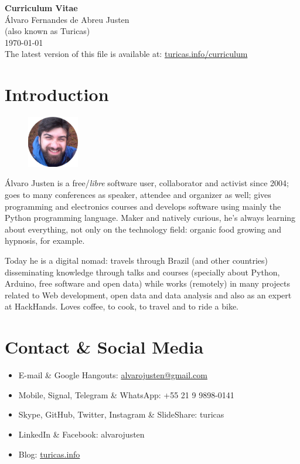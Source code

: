 \documentclass[a4paper,11pt]{article}
\begin{document}
\pagestyle{empty}

\begin{center}
 \huge{\textbf{Curriculum Vitae}}
 \\
 \huge{Álvaro Fernandes de Abreu Justen}
 \\
 \small{(also known as Turicas)}
 \large{\\}
 \large{\today}
 \\
 \small{The latest version of this file is available at:
        \href{http://turicas.info/curriculum}{turicas.info/curriculum}}
\end{center}

\newcommand{\titulo}[1]{\section*{#1}}
\renewcommand{\labelitemi}{$\diamond$}
\renewcommand{\labelitemii}{$\rightarrow$}

\titulo{Introduction}
\begin{figure}
	\begin{center}
		\includegraphics[width=0.2\textwidth]{turicas}
	\end{center}
\end{figure}

Álvaro Justen is a free/\textit{libre} software user, collaborator and activist
since 2004; goes to many conferences as speaker, attendee and organizer as
well; gives programming and electronics courses and develops software using
mainly the Python programming language. Maker and natively curious, he's always
learning about everything, not only on the technology field: organic food
growing and hypnosis, for example.

Today he is a digital nomad: travels through Brazil (and other countries)
disseminating knowledge through talks and courses (specially about Python,
Arduino, free software and open data) while works (remotely) in many projects
related to Web development, open data and data analysis and also as an expert
at HackHands. Loves coffee, to cook, to travel and to ride a bike.


\titulo{Contact \& Social Media}
	\begin{itemize}
		\renewcommand{\labelitemi}{}
		\item E-mail \& Google Hangouts: \url{alvarojusten@gmail.com}
		\item Mobile, Signal, Telegram \& WhatsApp: +55 21 9 9898-0141
		\item Skype, GitHub, Twitter, Instagram \& SlideShare: turicas
		\item LinkedIn \& Facebook: alvarojusten
		\item Blog: \href{http://turicas.info/}{turicas.info}
	\end{itemize}
\end{document}
